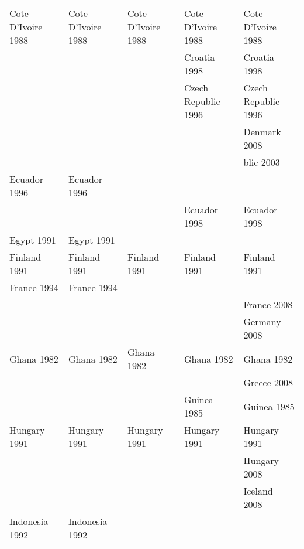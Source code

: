 \begin{table}[ht]
{\begin{tabular}{lllll}
  Cote D'Ivoire 1988\cellcolor[gray]{0.916666666666667} & Cote D'Ivoire 1988\cellcolor[gray]{0.916666666666667} & Cote D'Ivoire 1988\cellcolor[gray]{0.916666666666667} & Cote D'Ivoire 1988\cellcolor[gray]{0.916666666666667} & Cote D'Ivoire 1988\cellcolor[gray]{0.916666666666667} \\ 
   &  &  & Croatia 1998\cellcolor[gray]{0.5} & Croatia 1998\cellcolor[gray]{0.5} \\ 
   &  &  & Czech Republic 1996\cellcolor[gray]{0.5} & Czech Republic 1996\cellcolor[gray]{0.5} \\ 
   &  &  &  & Denmark 2008\cellcolor[gray]{0.5} \\ 
   &  &  &  & blic 2003\cellcolor[gray]{0.5} \\ 
  Ecuador 1996\cellcolor[gray]{0.5} & Ecuador 1996\cellcolor[gray]{0.5} &  &  &  \\ 
   &  &  & Ecuador 1998\cellcolor[gray]{0.5} & Ecuador 1998\cellcolor[gray]{0.5} \\ 
  Egypt 1991\cellcolor[gray]{0.5} & Egypt 1991\cellcolor[gray]{0.5} &  &  &  \\ 
  Finland 1991\cellcolor[gray]{0.5} & Finland 1991\cellcolor[gray]{0.5} & Finland 1991\cellcolor[gray]{0.5} & Finland 1991\cellcolor[gray]{0.5} & Finland 1991\cellcolor[gray]{0.5} \\ 
  France 1994\cellcolor[gray]{0.5} & France 1994\cellcolor[gray]{0.5} &  &  &  \\ 
   &  &  &  & France 2008\cellcolor[gray]{0.5} \\ 
   &  &  &  & Germany 2008\cellcolor[gray]{0.5} \\ 
  Ghana 1982\cellcolor[gray]{0.833333333333333} & Ghana 1982\cellcolor[gray]{0.833333333333333} & Ghana 1982\cellcolor[gray]{0.833333333333333} & Ghana 1982\cellcolor[gray]{0.833333333333333} & Ghana 1982\cellcolor[gray]{0.833333333333333} \\ 
   &  &  &  & Greece 2008\cellcolor[gray]{0.5} \\ 
   &  &  & Guinea 1985\cellcolor[gray]{1} & Guinea 1985\cellcolor[gray]{1} \\ 
  Hungary 1991\cellcolor[gray]{0.75} & Hungary 1991\cellcolor[gray]{0.75} & Hungary 1991\cellcolor[gray]{0.75} & Hungary 1991\cellcolor[gray]{0.75} & Hungary 1991\cellcolor[gray]{0.75} \\ 
   &  &  &  & Hungary 2008\cellcolor[gray]{0.5} \\ 
   &  &  &  & Iceland 2008\cellcolor[gray]{0.5} \\ 
  Indonesia 1992\cellcolor[gray]{1} & Indonesia 1992\cellcolor[gray]{1} &  &  &  \\ 

\end{tabular}}
\end{table}
